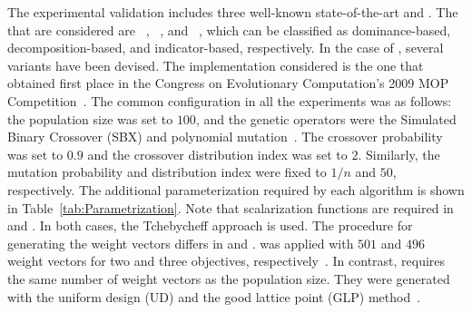 The experimental validation includes three well-known state-of-the-art \MOEAS{} and \VSDMOEA{}.
%
The \MOEAS{} that are considered are \NSGAII{}~\cite{Joel:jMetal}, \MOEAD{}~\cite{MOEADCode}, and \RMOEA{}~\cite{R2EMOACode},
which can be classified as dominance-based, decomposition-based, and indicator-based, respectively.
%
In the case of \MOEAD{}, several variants have been devised.
%
The \MOEAD{} implementation considered is the one that obtained first place in the Congress on Evolutionary Computation's
2009 MOP Competition~\cite{zhang2009performance}.
%
The common configuration in all the experiments was as follows: the population size was set to $100$, and the genetic operators were the Simulated Binary Crossover (SBX) and polynomial
mutation~\cite{Joel:SBX1994, Joel:Mutation}.
%
The crossover probability was set to $0.9$ and the crossover distribution index was set to $2$.
%
Similarly, the mutation probability and distribution index were fixed to $1/n$ and $50$, respectively.
%
The additional parameterization required by each algorithm is shown in Table~\ref{tab:Parametrization}.
%
Note that scalarization functions are required in \MOEAD{} and \RMOEA{}.
%
In both cases, the Tchebycheff approach is used.
%
The procedure for generating the weight vectors differs in \MOEAD{} and \RMOEA{}.
%
\RMOEA{} was applied with $501$ and $496$ weight vectors for two and three objectives, respectively~\cite{trautmann2013r2}.
%
In contrast, \MOEAD{} requires the same number of weight vectors as the population size.
%
They were generated with the uniform design (UD) and the good lattice point (GLP) method~\cite{Joel:MOEAD_Uniform_Design, Joel:Kuhn_Munkres}.

